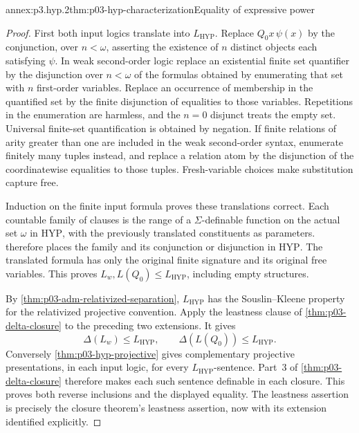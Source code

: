 \begin{annexitem}{annex:p3.hyp.2}{thm:p03-hyp-characterization}{Equality of expressive power}
\begin{proof}
First both input logics translate into \(L_{\mathrm{HYP}}\).
Replace \(Q_0x\,\psi(x)\) by the conjunction, over \(n<\omega\),
asserting the existence of \(n\) distinct objects each satisfying
\(\psi\). In weak second-order logic replace an existential finite
set quantifier by the disjunction over \(n<\omega\) of the formulas
obtained by enumerating that set with \(n\) first-order variables.
Replace an occurrence of membership in the quantified set by the
finite disjunction of equalities to those variables. Repetitions in
the enumeration are harmless, and the \(n=0\) disjunct treats the
empty set. Universal finite-set quantification is obtained by
negation. If finite relations of arity greater than one are included
in the weak second-order syntax, enumerate finitely many tuples
instead, and replace a relation atom by the disjunction of the
coordinatewise equalities to those tuples. Fresh-variable choices make
substitution capture free.

Induction on the finite input formula proves these translations
correct. Each countable family of clauses is the range of a
\(\Sigma\)-definable function on the actual set \(\omega\) in
\(\mathrm{HYP}\), with the previously translated constituents as
parameters.  therefore
places the family and its conjunction or disjunction in
\(\mathrm{HYP}\). The translated formula has only the original
finite signature and its original free variables. This proves
\(L_w,L(Q_0)\leq L_{\mathrm{HYP}}\), including empty structures.

By \cref{thm:p03-adm-relativized-separation},
\(L_{\mathrm{HYP}}\) has the Souslin--Kleene property for the
relativized projective convention. Apply the leastness clause of
\cref{thm:p03-delta-closure} to the preceding two extensions. It gives
\[
 \Delta(L_w)\leq L_{\mathrm{HYP}},\qquad
 \Delta(L(Q_0))\leq L_{\mathrm{HYP}}.
\]
Conversely \cref{thm:p03-hyp-projective} gives complementary projective
presentations, in each input logic, for every
\(L_{\mathrm{HYP}}\)-sentence. Part~3 of
\cref{thm:p03-delta-closure} therefore makes each such sentence
definable in each closure. This proves both reverse inclusions and
the displayed equality. The leastness assertion is precisely the
closure theorem's leastness assertion, now with its extension
identified explicitly.
\end{proof}
\end{annexitem}
